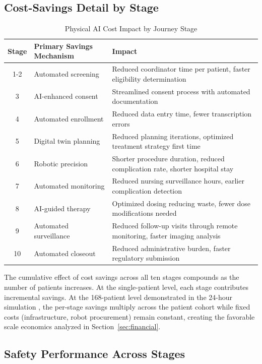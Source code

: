 \subsection{Cost-Savings Detail by Stage}
\label{subsec:journey-cost-detail}

\begin{table}[H]
\centering
\caption{Physical AI Cost Impact by Journey Stage}
\label{tab:journey-cost-stage}
\small
\begin{tabularx}{\textwidth}{c l X}
\toprule
\textbf{Stage} & \textbf{Primary Savings Mechanism} & \textbf{Impact} \\
\midrule
1-2 & Automated screening & Reduced coordinator time per patient, faster eligibility determination \\
3 & AI-enhanced consent & Streamlined consent process with automated documentation \\
4 & Automated enrollment & Reduced data entry time, fewer transcription errors \\
5 & Digital twin planning & Reduced planning iterations, optimized treatment strategy first time \\
6 & Robotic precision & Shorter procedure duration, reduced complication rate, shorter hospital stay \\
7 & Automated monitoring & Reduced nursing surveillance hours, earlier complication detection \\
8 & AI-guided therapy & Optimized dosing reducing waste, fewer dose modifications needed \\
9 & Automated surveillance & Reduced follow-up visits through remote monitoring, faster imaging analysis \\
10 & Automated closeout & Reduced administrative burden, faster regulatory submission \\
\bottomrule
\end{tabularx}
\end{table}

The cumulative effect of cost savings across all ten stages compounds as the
number of patients increases. At the single-patient level, each stage
contributes incremental savings. At the 168-patient level demonstrated in the
24-hour simulation \cite{site-docs}, the per-stage savings multiply across the
patient cohort while fixed costs (infrastructure, robot procurement) remain
constant, creating the favorable scale economics analyzed in
Section~\ref{sec:financial}.

\subsection{Safety Performance Across Stages}
\label{subsec:journey-safety}


